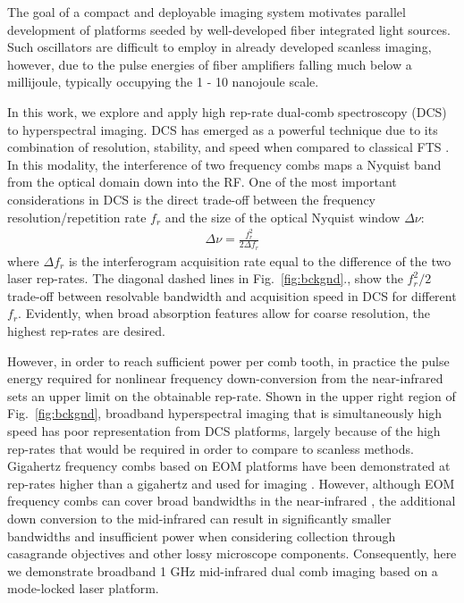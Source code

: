 \documentclass{optica-article}
\begin{document}
The goal of a compact and deployable imaging system motivates parallel development of platforms seeded by well-developed fiber integrated light sources. Such oscillators are difficult to employ in already developed scanless imaging, however, due to the pulse energies of fiber amplifiers falling much below a millijoule, typically occupying the 1 - 10 nanojoule scale. 

In this work, we explore and apply high rep-rate dual-comb spectroscopy (DCS) to hyperspectral imaging. DCS has emerged as a powerful technique due to its combination of resolution, stability, and speed when compared to classical FTS \cite{coddingtonDualcombSpectroscopy2016}. In this modality, the interference of two frequency combs maps a Nyquist band from the optical domain down into the RF. One of the most important considerations in DCS is the direct trade-off between the frequency resolution/repetition rate $f_r$ and the size of the optical Nyquist window $\Delta \nu$:
% 
\begin{align}
    \Delta \nu = \frac{f_r^2}{2 \Delta f_r}
    \label{eq:dcs}
\end{align}
% 
where $\Delta f_r$ is the interferogram acquisition rate equal to the difference of the two laser rep-rates. The diagonal dashed lines in \mbox{Fig. \ref{fig:bckgnd}}., show the $f_r^2/2$ trade-off between resolvable bandwidth and acquisition speed in DCS for different $f_r$. Evidently, when broad absorption features allow for coarse resolution, the highest rep-rates are desired. 

However, in order to reach sufficient power per comb tooth, in practice the pulse energy required for nonlinear frequency down-conversion from the near-infrared sets an upper limit on the obtainable rep-rate. Shown in the upper right region of \mbox{Fig. \ref{fig:bckgnd}}, broadband hyperspectral imaging that is simultaneously high speed has poor representation from DCS platforms, largely because of the high rep-rates that would be required in order to compare to scanless methods. Gigahertz frequency combs based on EOM platforms have been demonstrated at rep-rates higher than a gigahertz \cite{kowligyMidinfraredFrequencyCombs2020} and used for imaging \cite{ullahkhanDirectHyperspectralDualcomb2020,khanSubGHzOpticalResolution2023}. However, although EOM frequency combs can cover broad bandwidths in the near-infrared \cite{carlsonBroadbandElectroopticDualcomb2020}, the additional down conversion to the mid-infrared can result in significantly smaller bandwidths and insufficient power when considering collection through casagrande objectives and other lossy microscope components. Consequently, here we demonstrate broadband 1 GHz mid-infrared dual comb imaging based on a mode-locked laser platform.
\end{document}
